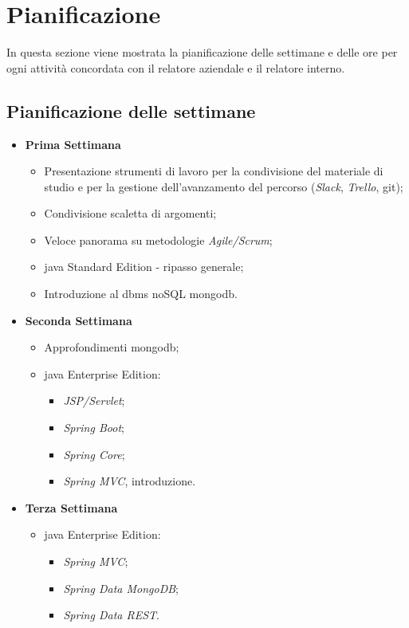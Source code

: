 
\section{Pianificazione}

In questa sezione viene mostrata la pianificazione delle settimane e delle ore per ogni attività concordata con il relatore aziendale e il relatore interno.

\subsection{Pianificazione delle settimane}

\begin{itemize}
	\item \textbf{Prima Settimana}
	\begin{itemize}
		\item Presentazione strumenti di lavoro per la condivisione del materiale di studio e per la gestione
		dell'avanzamento del percorso (\textit{Slack}, \textit{Trello}, \gls{git}\gloss);
		\item Condivisione scaletta di argomenti;
		\item Veloce panorama su metodologie \textit{Agile/Scrum}; %
		\item \gls{java} Standard Edition - ripasso generale; %
		\item Introduzione al \gls{dbms} noSQL \gls{mongodb}. %
	\end{itemize}

	\item \textbf{Seconda Settimana}
	\begin{itemize}
		\item Approfondimenti \gls{mongodb}; %
		\item \gls{java} Enterprise Edition:
		\begin{itemize}
			\item \textit{JSP/Servlet}; %
			\item \textit{Spring Boot}; %
			\item \textit{Spring Core}; %
			\item \textit{Spring MVC}, introduzione. %
		\end{itemize}
	\end{itemize}

	\item \textbf{Terza Settimana}
	\begin{itemize}
		\item \gls{java} Enterprise Edition:
		\begin{itemize}
			\item \textit{Spring MVC}; %
			\item \textit{Spring Data MongoDB}; %
			\item \textit{Spring Data REST}. %
		\end{itemize}
	\end{itemize}


\end{itemize}
